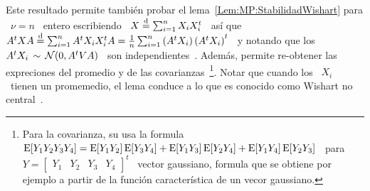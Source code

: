 Este resultado  permite tambi\'en probar  el lema~\ref{Lem:MP:StabilidadWishart}
para \  $\nu = n$  \ entero  escribiendo \ $X  \stackrel{\mathrm{d}}{=} \sum_{i=1}^n X_i  X_i^t$ \
as\'i que \ $A^t X A \stackrel{\mathrm{d}}{=}  \sum_{i=1}^n A^t X_i X_i^t A = \frac1n \sum_{i=1}^n
\left( A^t X_i \right) \left( A^t X_i  \right)^t$ \ y notando que los \ $A^t X_i
\, \sim \, \mathcal{N}(0, A^t V A)$ \ son independientes~\cite{Seb04}.  Adem\'as, permite
re-obtener las  expreciones del promedio y de  las covarianzas~\footnote{Para la
  covarianza, su usa la formula \ $\operatorname{E}[Y_1 Y_2 Y_3 Y_4] = \operatorname{E}[Y_1 Y_2]\operatorname{E}[Y_3
  Y_4]  + \operatorname{E}[Y_1 Y_3]\operatorname{E}[Y_2  Y_4] +  \operatorname{E}[Y_1 Y_4]\operatorname{E}[Y_2  Y_3]$ \  para $Y
  = \begin{bmatrix}  Y_1 & Y_2 &  Y_3 & Y_4 \end{bmatrix}^t$  \ vector gaussiano,
  formula que se  obtiene por ejemplo a partir  de la funci\'on caracter\'istica
  de un vecor  gaussiano.}. Notar que cuando los \ $X_i$  \ tienen un promemedio,
el  lema conduce  a  lo que  es  conocido como  Wishart no  central~\cite{And03,
  Seb04}.


